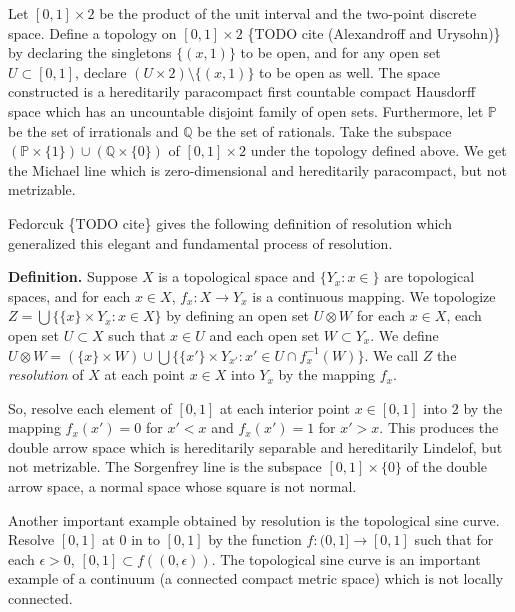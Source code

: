   Let \([0, 1]\times 2\) be the product of the unit interval and the two-point
  discrete space. Define a topology on \([0, 1]\times 2\)
  \{TODO cite (Alexandroff and Urysohn)\} by declaring the singletons
  \(\{(x, 1)\}\) to be open, and for any open set \(U \subset [0, 1]\), declare
  \((U\times 2)\setminus \{(x, 1)\}\) to be open as well. The space constructed
  is a hereditarily paracompact first countable compact Hausdorff space which
  has an uncountable disjoint family of open sets.
  Furthermore, let \(\mathbb{P}\) be the
  set of irrationals and \(\mathbb{Q}\) be the set of rationals. Take the
  subspace \((\mathbb{P}\times \{1\}) \cup (\mathbb{Q}\times \{0\})\) of
  \([0, 1]\times 2\) under the topology defined above. We get the Michael
  line which is zero-dimensional and hereditarily paracompact, but not
  metrizable.

  Fedorcuk \{TODO cite\}
  gives the following definition of resolution which generalized this
  elegant and fundamental process of resolution.

  \textbf{Definition.} Suppose \(X\) is a topological space and
  \(\{Y_x: x\in \}\) are topological spaces, and for each \(x\in X\),
  \(f_x: X\rightarrow Y_x\) is a continuous mapping. We topologize
  \(Z=\bigcup \{\{x\}\times Y_x: x\in X\}\) by defining an open set
  \(U\otimes W\) for each \(x\in X\), each open set \(U\subset X\) such
  that \(x\in U\) and each open set  \(W\subset Y_x\). We define
  \(
    U\otimes W=(\{x\}\times W)
      \cup
    \bigcup \{\{x'\}\times Y_{x'}: x'\in U\cap f_{x}^{-1}(W)\}
  \).
  We call \(Z\) the \textit{resolution} of \(X\) at each point \(x\in X\)
  into \(Y_x\) by the mapping \(f_x\).

  So, resolve each element of \([0,1]\) at each interior point \(x\in [0, 1]\)
  into \(2\) by the mapping \(f_x(x')=0\) for \(x'<x\) and
  \(f_x(x')=1\) for \(x'>x\). This produces the double arrow space which is
  hereditarily separable and hereditarily Lindelof, but not metrizable.
  The Sorgenfrey line is the subspace \([0, 1]\times \{0\}\) of the double
  arrow space, a normal space whose square is not normal.

  Another important example obtained by resolution is the topological sine curve.
  Resolve \([0, 1]\) at \(0\) in to \([0, 1]\) by the function
  \(f: (0, 1]\rightarrow [0, 1]\) such that for each
  \(\epsilon >0\), \([0, 1]\subset f((0, \epsilon))\). The topological sine curve
  is an important example of a continuum (a connected compact metric space) which
  is not locally connected.

